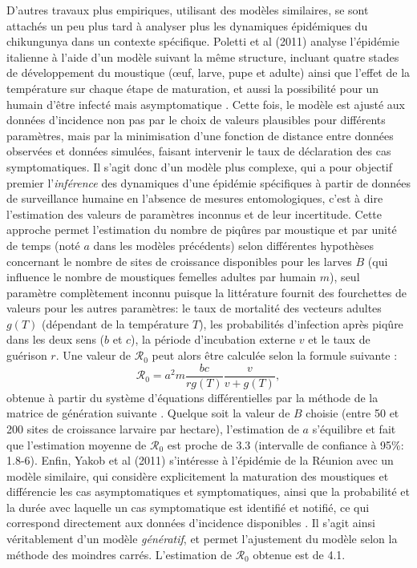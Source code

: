 D'autres travaux plus empiriques, utilisant des modèles similaires, se sont attachés un peu plus tard à analyser plus les dynamiques épidémiques du chikungunya dans un contexte spécifique.
Poletti et al (2011) analyse l'épidémie italienne à l'aide d'un modèle suivant la même structure, incluant quatre stades de développement du moustique (\oe uf, larve, pupe et adulte) ainsi que l'effet de la température sur chaque étape de maturation, et aussi la possibilité pour un humain d'être infecté mais asymptomatique \cite{poletti2011transmission}.
Cette fois, le modèle est ajusté aux données d'incidence non pas par le choix de valeurs plausibles pour différents paramètres, mais par la minimisation d'une fonction de distance entre données observées et données simulées, faisant intervenir le taux de déclaration des cas symptomatiques.
Il s'agit donc d'un modèle plus complexe, qui a pour objectif premier l'{\em inférence} des dynamiques d'une épidémie spécifiques à partir de données de surveillance humaine en l'absence de mesures entomologiques, c'est à dire l'estimation des valeurs de paramètres inconnus et de leur incertitude.
Cette approche permet l'estimation du nombre de piqûres par moustique et par unité de temps (noté $a$ dans les modèles précédents) selon différentes hypothèses concernant le nombre de sites de croissance disponibles pour les larves $B$ (qui influence le nombre de moustiques femelles adultes par humain $m$), seul paramètre complètement inconnu puisque la littérature fournit des fourchettes de valeurs pour les autres paramètres:  le taux de mortalité des vecteurs adultes $g(T)$ (dépendant de la température $T$), les probabilités d'infection après piqûre dans les deux sens ($b$ et $c$), la période d'incubation externe $v$ et le taux de guérison $r$. 
Une valeur de  $\mathcal{R}_0$ peut alors être calculée selon la formule suivante :
\begin{equation}
\mathcal{R}_0 = a^2 m \frac{bc}{rg(T)} \frac{v}{v+g(T)},
\end{equation}
obtenue à partir du système d'équations différentielles par la méthode de la matrice de génération suivante \cite{diekmann2009construction}.
Quelque soit la valeur de $B$ choisie (entre 50 et 200 sites de croissance larvaire par hectare), l'estimation de $a$ s'équilibre et fait que l'estimation moyenne de $\mathcal{R}_0$ est proche de 3.3 (intervalle de confiance à 95\%: 1.8-6).
Enfin, Yakob et al (2011) s'intéresse à l'épidémie de la Réunion avec un modèle similaire, qui considère explicitement la maturation des moustiques et différencie les cas asymptomatiques et symptomatiques, ainsi que la probabilité et la durée avec laquelle un cas symptomatique est identifié et notifié, ce qui correspond directement aux données d'incidence disponibles \cite{yakob_mathematical_2013}. 
Il s'agit ainsi véritablement d'un modèle {\em génératif}, et permet l'ajustement du modèle selon la méthode des moindres carrés.
L'estimation de $\mathcal{R}_0$ obtenue est de 4.1.


